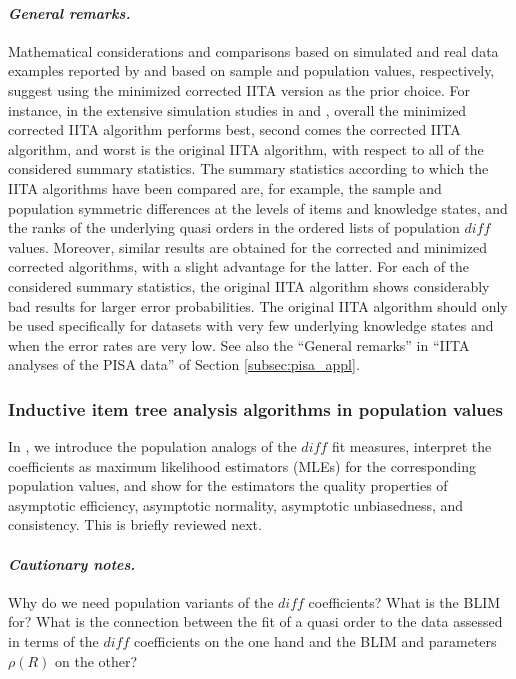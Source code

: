 \documentclass[nojss]{jss}
\begin{document}
\paragraph{\it General remarks.}
Mathematical considerations and comparisons based on simulated and real data examples 
reported by \cite{SU:09} and \cite{US:10} based on sample and population values, respectively, suggest using the minimized corrected IITA version as the prior choice. 
For instance, in the extensive simulation studies in \cite{SU:09} and \cite{US:10}, 
overall the minimized corrected IITA algorithm performs best, second comes the corrected IITA algorithm, and worst is the original IITA algorithm, with respect to all of the considered summary statistics. The summary statistics according to which the IITA algorithms have been compared are, 
for example, the sample
and population symmetric differences at the levels of items and knowledge states, and 
the ranks of the underlying quasi orders in the ordered lists of population $\mathit{diff}$ values. 
Moreover, similar results are obtained for the corrected and minimized corrected algorithms, 
with a slight advantage for the latter. For each of the considered summary statistics, 
the original IITA algorithm shows considerably bad results for larger error probabilities.
The original IITA algorithm should only be used specifically for datasets with very few 
underlying knowledge states and when the error rates are very low.
See also the ``General remarks'' in ``IITA analyses of the PISA data'' 
of Section \ref{subsec:pisa_appl}.

\subsubsection{Inductive item tree analysis algorithms in population values}
\label{subsec:population_iita}

In \cite{US:10}, we introduce the population analogs of the $\mathit{diff}$ fit measures, 
interpret the coefficients as maximum likelihood estimators (MLEs) 
for the corresponding population values, and show for the estimators the quality properties
of asymptotic efficiency, asymptotic normality, asymptotic unbiasedness, 
and consistency. This is briefly reviewed next.

\paragraph{\it Cautionary notes.}
Why do we need population variants of the $\mathit{diff}$ coefficients? 
What is the BLIM for? What is the connection between the fit of a quasi order 
to the data assessed in terms of the $\mathit{diff}$ coefficients on the one hand
and the BLIM and parameters $\rho(R)$ on the other? 
\end{document}
